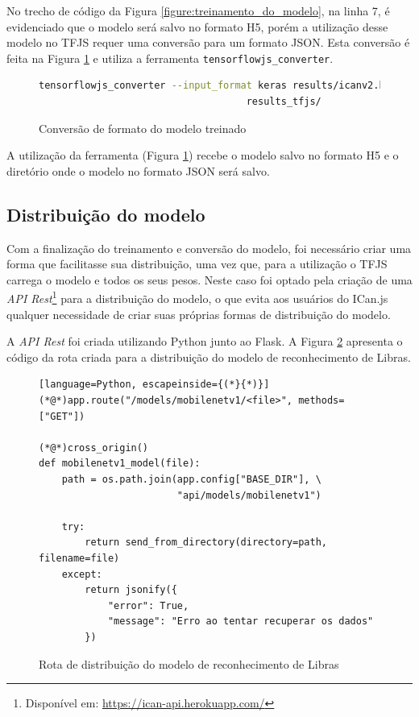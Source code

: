 \par No trecho de código da Figura \ref{figure:treinamento_do_modelo}, na linha 7, é evidenciado que o modelo será salvo no formato H5, porém a utilização desse modelo no TFJS requer uma conversão para um formato JSON. Esta conversão é feita na Figura \ref{figure:conversao_do_modelo} e utiliza a ferramenta \texttt{tensorflowjs\_converter}.

\begin{figure}[H]
    \centering
    \caption{Conversão de formato do modelo treinado}
    \begin{lstlisting}[language=sh]
tensorflowjs_converter --input_format keras results/icanv2.h5 \
                                    results_tfjs/
    \end{lstlisting}
    \label{figure:conversao_do_modelo}
\end{figure}

\par A utilização da ferramenta (Figura \ref{figure:conversao_do_modelo}) recebe o modelo salvo no formato H5 e o diretório onde o modelo no formato JSON será salvo.

\subsection{Distribuição do modelo}

\par Com a finalização do treinamento e conversão do modelo, foi necessário criar uma forma que facilitasse sua distribuição, uma vez que, para a utilização o TFJS carrega o modelo e todos os seus pesos. Neste caso foi optado pela criação de uma \textit{API Rest}\footnote{Disponível em: \url{https://ican-api.herokuapp.com/}} para a distribuição do modelo, o que evita aos usuários do ICan.js qualquer necessidade de criar suas próprias formas de distribuição do modelo.

\par A \textit{API Rest} foi criada utilizando Python junto ao Flask. A Figura \ref{figure:exemplo_rota_flask} apresenta o código da rota criada para a distribuição do modelo de reconhecimento de Libras.

\begin{figure}[H]
    \centering
    \caption{Rota de distribuição do modelo de reconhecimento de Libras}
    \begin{lstlisting}[language=Python, escapeinside={(*}{*)}]
(*@*)app.route("/models/mobilenetv1/<file>", methods=["GET"])

(*@*)cross_origin()
def mobilenetv1_model(file):
    path = os.path.join(app.config["BASE_DIR"], \
                        "api/models/mobilenetv1")

    try:
        return send_from_directory(directory=path, filename=file)
    except:
        return jsonify({
            "error": True,
            "message": "Erro ao tentar recuperar os dados"
        })
    \end{lstlisting}
    \label{figure:exemplo_rota_flask}
\end{figure}

